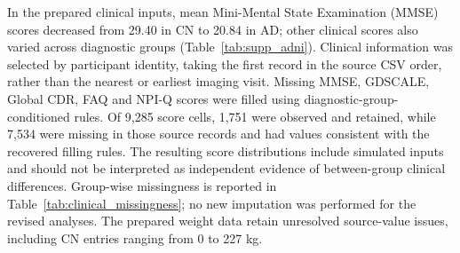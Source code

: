 In the prepared clinical inputs, mean Mini-Mental State Examination (MMSE) scores decreased from 29.40 in CN to 20.84 in AD; other clinical scores also varied across diagnostic groups (Table~\ref{tab:supp_adni}). Clinical information was selected by participant identity, taking the first record in the source CSV order, rather than the nearest or earliest imaging visit. Missing MMSE, GDSCALE, Global CDR, FAQ and NPI-Q scores were filled using diagnostic-group-conditioned rules. Of 9,285 score cells, 1,751 were observed and retained, while 7,534 were missing in those source records and had values consistent with the recovered filling rules. The resulting score distributions include simulated inputs and should not be interpreted as independent evidence of between-group clinical differences. Group-wise missingness is reported in Table~\ref{tab:clinical_missingness}; no new imputation was performed for the revised analyses. The prepared weight data retain unresolved source-value issues, including CN entries ranging from 0 to 227 kg.
